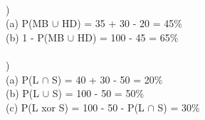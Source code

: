 \documentclass[12pt]{article}
\begin{document}
\hrulefill \\
\pagebreak


)\\
\indent (a) P(MB $\cup$ HD) = 35 + 30 - 20 = 45\%\\

(b) 1 - P(MB $\cup$ HD) = 100 - 45 = 65\%\\


\hrulefill \\


)\\
\indent (a) P(L $\cap$ S) = 40 + 30 - 50 = 20\%\\

(b)  P(L $\cup$ S) = 100 - 50 = 50\%\\

(c) P(L xor S) = 100 - 50 -  P(L $\cap$ S) = 30\%
\end{document}
